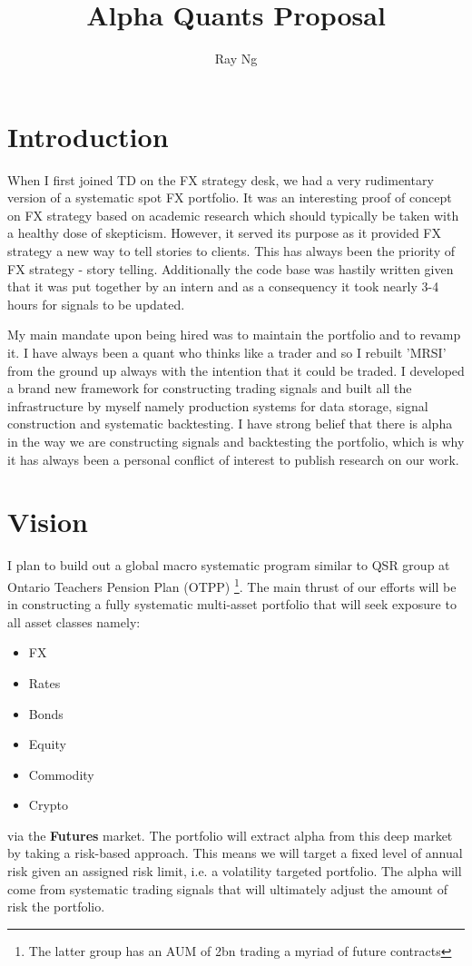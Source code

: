 \documentclass{article}
\title{Alpha Quants Proposal}
\author{Ray Ng}
\begin{document}
\maketitle



\section{Introduction}
When I first joined TD on the FX strategy desk, we had a very rudimentary version of a systematic spot FX portfolio. It was an interesting proof of concept on FX strategy based on academic research which should typically be taken with a healthy dose of skepticism. However, it served its purpose as it provided FX strategy a new way to tell stories to clients. This has always been the priority of FX strategy - story telling. Additionally the code base was hastily written given that it was put together by an intern and as a consequency it took nearly 3-4 hours for signals to be updated. 

My main mandate upon being hired was to maintain the portfolio and to revamp it. I have always been a quant who thinks like a trader and so I rebuilt 'MRSI' from the ground up always with the intention that it could be traded. I developed a brand new framework for constructing trading signals and built all the infrastructure by myself namely production systems for data storage, signal construction and systematic backtesting. I have strong belief that there is alpha in the way we are constructing signals and backtesting the portfolio, which is why it has always been a personal conflict of interest to publish research on our work. 

\section{Vision}
I plan to build out a global macro systematic program similar to QSR group at Ontario Teachers Pension Plan (OTPP) \footnote{The latter group has an AUM of 2bn trading a myriad of future contracts}. The main thrust of our efforts will be in constructing a fully systematic multi-asset portfolio that will seek exposure to all asset classes namely: 
\begin{itemize}
\item FX
\item Rates
\item Bonds
\item Equity
\item Commodity 
\item Crypto
\end{itemize}
via the \textbf{Futures} market. The portfolio will extract alpha from this deep market by taking a risk-based approach. This means we will target a fixed level of annual risk given an assigned risk limit, i.e. a volatility targeted portfolio. The alpha will come from systematic trading signals that will ultimately adjust the amount of risk the portfolio.
\end{document}
